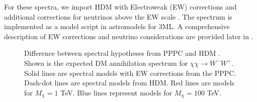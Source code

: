 For these spectra, we import HDM with Electroweak (EW) corrections and additional corrections for neutrinos above the EW scale \cite{HDMSpectra}.
The spectrum is implemented as a model script in astromodels for 3ML.
A comprehensive description of EW corrections and neutrino considerations are provided later in .

\begin{figure}[t]
    \caption{Difference between spectral hypotheses from PPPC \cite{Cirelli_2011} and HDM \cite{HDMSpectra}. Shown is the expected DM annihilation spectrum for $\chi\chi \rightarrow W^-W^+$. Solid lines are spectral models with EW corrections from the PPPC. Dash-dot lines are spectral models from HDM. Red lines are models for $M_\chi = 1$ TeV. Blue lines represent models for $M_\chi = 100$ TeV.}
    \label{fig:pppc_vs_hdm}
\end{figure}

